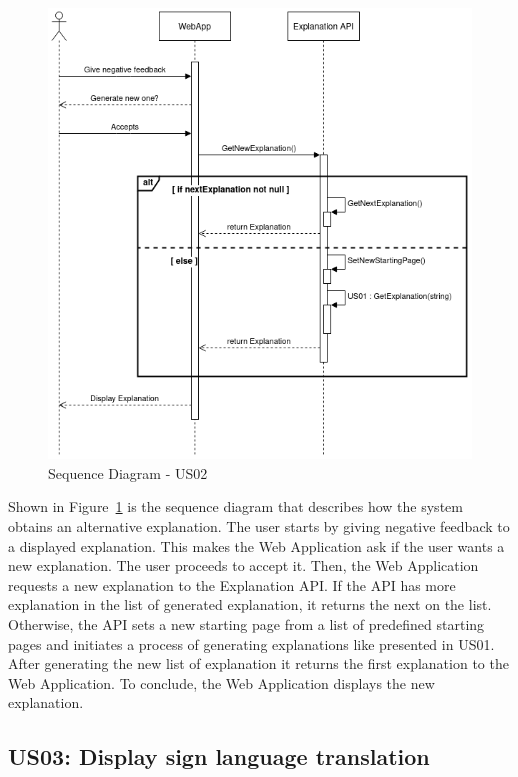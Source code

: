 \begin{figure}[H]
\centering
\includegraphics[scale=0.45]{ch4/assets/US02_SD.png}
\caption[Sequence Diagram US02]{Sequence Diagram - US02}
\label{fig:sdus02}
\end{figure}

Shown in Figure~\ref{fig:sdus02} is the sequence diagram that describes how the system obtains an alternative explanation.
The user starts by giving negative feedback to a displayed explanation.
This makes the Web Application ask if the user wants a new explanation.
The user proceeds to accept it.
Then, the Web Application requests a new explanation to the Explanation API.
If the API has more explanation in the list of generated explanation, it returns the next on the list.
Otherwise, the API sets a new starting page from a list of predefined starting pages and initiates a process of generating explanations like presented in US01.
After generating the new list of explanation it returns the first explanation to the Web Application.
To conclude, the Web Application displays the new explanation.

\subsection{US03: Display sign language translation}

